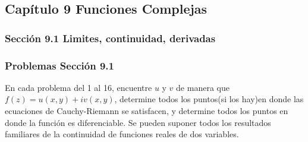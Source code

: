 
\subsection* {Cap\'itulo 9 Funciones Complejas}
	\subsubsection* {Secci\'on 9.1 Limites, continuidad, derivadas}
	\subsubsection* {Problemas Secci\'on 9.1}
\justify
En cada problema del 1 al 16, encuentre $u$ y $v$ de manera que $f(z) = u(x,y) + iv(x,y)$, determine todos los puntos(si los hay)en donde las ecuaciones de Cauchy-Riemann se satisfacen, y determine todos los puntos en donde la funci\'on es diferenciable. Se pueden suponer todos los resultados familiares de la continuidad de funciones reales de dos variables.
